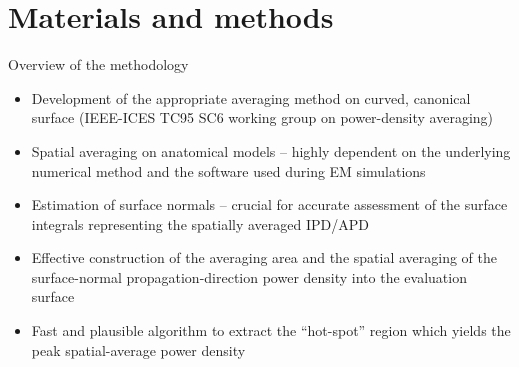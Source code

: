 \documentclass[xcolor=dvipsnames,10pt]{beamer}
\begin{document}
\section[Materials and methods]{Materials and methods}

\begin{frame}{Overview of the methodology}
    \begin{itemize}
        \item Development of the appropriate averaging method on curved, canonical surface (IEEE-ICES TC95 SC6 working group on power-density averaging)
        \item Spatial averaging on anatomical models -- highly dependent on the underlying numerical method and the software used during EM simulations
        \item Estimation of surface normals -- crucial for accurate assessment of the surface integrals representing the spatially averaged IPD/APD
        \item Effective construction of the averaging area and the spatial averaging of the surface-normal propagation-direction power density into the evaluation surface
        \item Fast and plausible algorithm to extract the ``hot-spot'' region which yields the peak spatial-average power density
    \end{itemize}
\end{frame}
\end{document}
